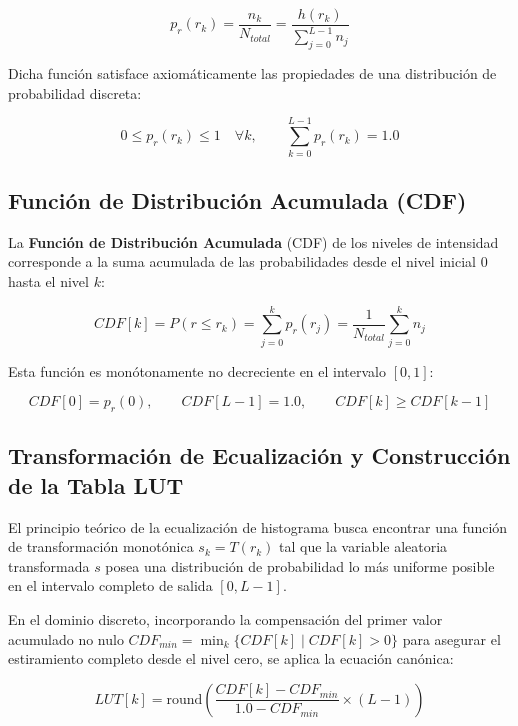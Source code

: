 \documentclass[12pt,a4paper]{article}
\begin{document}
\begin{equation}
p_r(r_k) = \frac{n_k}{N_{total}} = \frac{h(r_k)}{\sum_{j=0}^{L-1} n_j}
\end{equation}

Dicha función satisface axiomáticamente las propiedades de una distribución de probabilidad discreta:

\begin{equation}
0 \le p_r(r_k) \le 1 \quad \forall k, \qquad \sum_{k=0}^{L-1} p_r(r_k) = 1.0
\end{equation}

\subsection{Función de Distribución Acumulada (CDF)}

La \textbf{Función de Distribución Acumulada} (CDF) de los niveles de intensidad corresponde a la suma acumulada de las probabilidades desde el nivel inicial $0$ hasta el nivel $k$:

\begin{equation}
CDF[k] = P(r \le r_k) = \sum_{j=0}^{k} p_r(r_j) = \frac{1}{N_{total}} \sum_{j=0}^{k} n_j
\end{equation}

Esta función es monótonamente no decreciente en el intervalo $[0, 1]$:

\begin{equation}
CDF[0] = p_r(0), \qquad CDF[L-1] = 1.0, \qquad CDF[k] \ge CDF[k-1]
\end{equation}

\subsection{Transformación de Ecualización y Construcción de la Tabla LUT}

El principio teórico de la ecualización de histograma busca encontrar una función de transformación monotónica $s_k = T(r_k)$ tal que la variable aleatoria transformada $s$ posea una distribución de probabilidad lo más uniforme posible en el intervalo completo de salida $[0, L-1]$.

En el dominio discreto, incorporando la compensación del primer valor acumulado no nulo $CDF_{min} = \min_{k}\{CDF[k] \mid CDF[k] > 0\}$ para asegurar el estiramiento completo desde el nivel cero, se aplica la ecuación canónica:

\begin{equation}
LUT[k] = \text{round}\left( \frac{CDF[k] - CDF_{min}}{1.0 - CDF_{min}} \times (L - 1) \right)
\end{equation}
\end{document}
